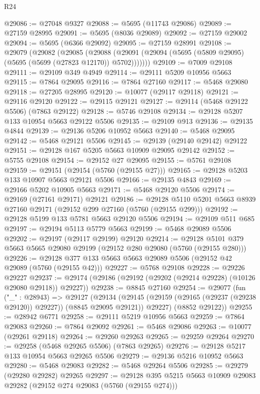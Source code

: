 \begin{lexlean}{R24}
\begin{coremodule}
@29086 := @27048 @9327
@29088 := @5695 (@11743 @29086)
@29089 := @27159 @28995
@29091 := @5695 (@8036 @29089)
@29092 := @27159 @29002
@29094 := @5695 (@6366 @29092)
@29095 := @27159 @28991
@29108 := @29079
    (@29082
      (@29085
        (@29088 (@29091 (@29094 (@5695 (@5809 @29095) (@5695 (@5699 (@27823 @12170)) @5702)))))))
@29109 := @7009 @29108
@29111 := @29109 @349 @4949
@29114 := @29111 @5209 @10956 @5663
@29115 := @7864 @29095
@29116 := @7864 @27160
@29117 := @5468 @29080
@29118 := @27205 @28995
@29120 := @10077 (@29117 @29118)
@29121 := @29116 @29120
@29122 := @29115 @29121
@29127 := @29114 (@5468 @29122 @5506) (@7863 @29122)
@29128 := @5746 @29108
@29134 := @29128 @5207 @133 @10954 @5663 @29122 @5506
@29135 := @29109 @913
@29136 := @29135 @4844
@29139 := @29136 @5206 @10952 @5663
@29140 := @5468 @29095
@29142 := @5468 @29121 @5506
@29145 := @29139 (@29140 @29142) @29122
@29151 := @29128 @167 @5205 @5663 @10909 @29095 @29142
@29152 := @5755 @29108
@29154 := @29152 @27 @29095
@29155 := @5761 @29108
@29159 := @29151 (@29154 (@5760 (@29155 @27)))
@29165 := @29128 @5203 @133 @10907 @5663 @29121 @5506
@29166 := @29135 @4843
@29169 := @29166 @5202 @10905 @5663
@29171 := @5468 @29120 @5506
@29174 := @29169 (@27161 @29171) @29121
@29186 := @29128 @5110 @5201 @5663 @8939 @27160 @29171 (@29152 @299 @27160 (@5760 (@29155 @299)))
@29192 := @29128 @5199 @133 @5781 @5663 @29120 @5506
@29194 := @29109 @511 @685
@29197 := @29194 @5113 @5779 @5663
@29199 := @5468 @29089 @5506
@29202 := @29197 (@29117 @29199) @29120
@29214 := @29128 @5101 @379 @5663 @5665 @29080 @29199 (@29152 @280 @29080 (@5760 (@29155 @280)))
@29226 := @29128 @377 @133 @5663 @5663 @29089 @5506 (@29152 @42 @29089 (@5760 (@29155 @42)))
@29227 := @5768 @29108
@29228 := @29226 @29227
@29237 := @29174 (@29186 (@29192 (@29202 (@29214 @29228) (@10126 @29080 @29118)) @29227))
@29238 := @8845 @27160
@29254 := @29077
    (fun ("_" : @28943) =>
    @29127
      (@29134
        (@29145 (@29159 (@29165 (@29237 (@29238 @29120)) @29227)) (@8845 @29095 @29121))
        @29227)
      (@8852 @29122))
@29255 := @28942 @6771
@29258 := @29111 @5219 @10956 @5663
@29259 := @7864 @29083
@29260 := @7864 @29092
@29261 := @5468 @29086
@29263 := @10077 (@29261 @29118)
@29264 := @29260 @29263
@29265 := @29259 @29264
@29270 := @29258 (@5468 @29265 @5506) (@7863 @29265)
@29276 := @29128 @5217 @133 @10954 @5663 @29265 @5506
@29279 := @29136 @5216 @10952 @5663
@29280 := @5468 @29083
@29282 := @5468 @29264 @5506
@29285 := @29279 (@29280 @29282) @29265
@29297 := @29128 @395 @5215 @5663 @10909 @29083 @29282 (@29152 @274 @29083 (@5760 (@29155 @274)))

\end{coremodule}
\end{lexlean}
